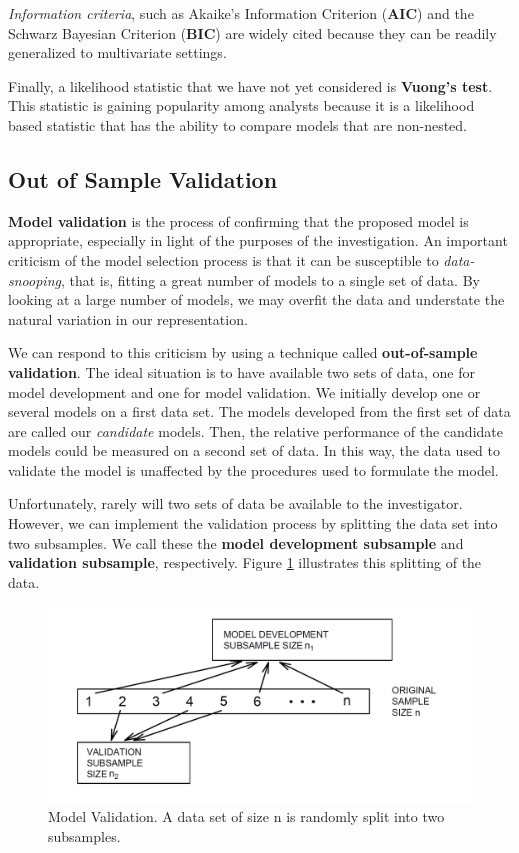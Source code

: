 \documentclass[]{book}
\theoremstyle{definition}
\theoremstyle{definition}
\theoremstyle{definition}
\theoremstyle{remark}
\begin{document}
\emph{Information criteria}, such as Akaike's Information Criterion
(\textbf{AIC}) and the Schwarz Bayesian Criterion (\textbf{BIC}) are
widely cited because they can be readily generalized to multivariate
settings.

Finally, a likelihood statistic that we have not yet considered is
\textbf{Vuong's test}. This statistic is gaining popularity among
analysts because it is a likelihood based statistic that has the ability
to compare models that are non-nested.

\subsection{Out of Sample Validation}\label{out-of-sample-validation}

\textbf{Model validation} is the process of confirming that the proposed
model is appropriate, especially in light of the purposes of the
investigation. An important criticism of the model selection process is
that it can be susceptible to \emph{data-snooping}, that is, fitting a
great number of models to a single set of data. By looking at a large
number of models, we may overfit the data and understate the natural
variation in our representation.

We can respond to this criticism by using a technique called
\textbf{out-of-sample validation}. The ideal situation is to have
available two sets of data, one for model development and one for model
validation. We initially develop one or several models on a first data
set. The models developed from the first set of data are called our
\emph{candidate} models. Then, the relative performance of the candidate
models could be measured on a second set of data. In this way, the data
used to validate the model is unaffected by the procedures used to
formulate the model.

Unfortunately, rarely will two sets of data be available to the
investigator. However, we can implement the validation process by
splitting the data set into two subsamples. We call these the
\textbf{model development subsample} and \textbf{validation subsample},
respectively. Figure \ref{fig:ModelValidation} illustrates this
splitting of the data.

\begin{figure}

{\centering \includegraphics[width=0.8\linewidth]{Figures/F5ModelValidation} 

}

\caption{Model Validation. A data set of size n is randomly split into two subsamples.}\label{fig:ModelValidation}
\end{figure}
\end{document}

